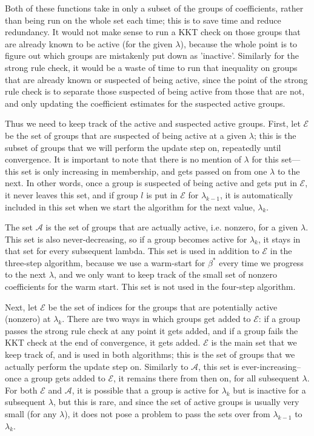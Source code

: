 \documentclass[titlepage]{article}
\begin{document}
Both of these functions take in only a subset of the groups of coefficients, rather than being run on the whole set each time; this is to save time and reduce redundancy. It would not make sense to run a KKT check on those groups that are already known to be active (for the given $\lambda$), because the whole point is to figure out which groups are mistakenly put down as 'inactive'. Similarly for the strong rule check, it would be a waste of time to run that inequality on groups that are already known or suspected of being active, since the point of the strong rule check is to separate those suspected of being active from those that are not, and only updating the coefficient estimates for the suspected active groups.

Thus we need to keep track of the active and suspected active groups. First, let $\mathcal{E}$ be the set of groups that are suspected of being active at a given $\lambda$; this is the subset of groups that we will perform the update step on, repeatedly until convergence. It is important to note that there is no mention of $\lambda$ for this set---this set is only increasing in membership, and gets passed on from one $\lambda$ to the next. In other words, once a group is suspected of being active and gets put in $\mathcal{E}$, it never leaves this set, and if group $l$ is put in $\mathcal{E}$ for $\lambda_{k-1}$, it is automatically included in this set when we start the algorithm for the next value, $\lambda_k$. 

The set $\mathcal{A}$ is the set of groups that are actually active, i.e. nonzero, for a given $\lambda$. This set is also never-decreasing, so if a group becomes active for $\lambda_k$, it stays in that set for every subsequent lambda. This set is used in addition to $\mathcal{E}$ in the three-step algorithm, because we use a warm-start for $\beta^*$ every time we progress to the next $\lambda$, and we only want to keep track of the small set of nonzero coefficients for the warm start. This set is not used in the four-step algorithm.

Next, let $\mathcal{E}$ be the set of indices for the groups that are potentially active (nonzero) at $\lambda_k$. There are two ways in which groups get added to $\mathcal{E}$: if a group passes the strong rule check at any point it gets added, and if a group fails the KKT check at the end of convergence, it gets added. $\mathcal{E}$ is the main set that we keep track of, and is used in both algorithms; this is the set of groups that we actually perform the update step on. Similarly to $\mathcal{A}$, this set is ever-increasing--once a group gets added to $\mathcal{E}$, it remains there from then on, for all subsequent $\lambda$. For both $\mathcal{E}$ and $\mathcal{A}$, it is possible that a group is active for $\lambda_{k}$ but is inactive for a subsequent $\lambda$, but this is rare, and since the set of active groups is usually very small (for any $\lambda$), it does not pose a problem to pass the sets over from $\lambda_{k-1}$ to $\lambda_k$.
\end{document}
